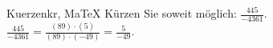 \begin{MAufgabe}{Kuerzen}{kr, MaTeX}
K\"urzen Sie soweit m\"oglich: $\frac{445}{-4361}$.\\ 
\ifLsg\MLoesung
\quad $\frac{445}{-4361}=\frac{(89)\cdot(5)}{(89)\cdot(-49)}=\frac{5}{-49}$.\else\relax\fi
 \end{MAufgabe}